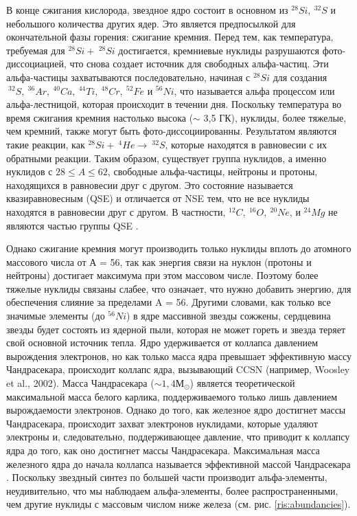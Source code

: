 \documentclass[%
master,    %
natbib,      %
subf,        %
href,        %
colorlinks,  %
]{disser}
\begin{document}
В конце сжигания кислорода, звездное ядро состоит в основном из $^{28}Si, \ ^{32}S$ и небольшого количества других ядер. Это является предпосылкой для окончательной фазы горения: сжигание кремния. Перед тем, как температура, требуемая для $^{28}Si + \ ^{28}Si$ достигается, кремниевые нуклиды разрушаются фото-диссоциацией, что снова создает источник для свободных альфа-частиц. Эти альфа-частицы захватываются последовательно, начиная с $^{28}Si$ для создания $\ ^{32}S, \ ^{36}Ar, \ ^{40}Ca, \ ^{44}Ti, \ ^{48}Cr, \ ^{52}Fe$ и $^{56}Ni$, что называется альфа процессом или альфа-лестницой, которая происходит в течении дня. Поскольку температура во время сжигания кремния настолько высока ($\sim$ 3,5 ГК), нуклиды, более тяжелые, чем кремний, также могут быть фото-диссоциированны. Результатом являются такие реакции, как  $^{28}Si + \ ^4He \rightarrow \ ^{32}S$, которые находятся в равновесии с их обратными реакции. Таким образом, существует группа нуклидов, а именно нуклидов с $28 \le A \le 62$, свободные альфа-частицы, нейтроны и протоны, находящихся в равновесии друг с другом. Это состояние называется квазиравновесным (QSE) и отличается от NSE тем, что не все нуклиды находятся в равновесии друг с другом. В частности, $^{12}C, \ ^{16}O, \ ^{20}Ne$, и $^{24}Mg$ не являются частью группы QSE \cite{qse}.

Однако сжигание кремния могут производить только нуклиды вплоть до атомного массового числа от А = 56, так как энергия связи на нуклон (протоны и нейтроны) достигает максимума при этом массовом числе. Поэтому более тяжелые нуклиды связаны слабее, что означает, что нужно добавить энергию, для обеспечения слияние за пределами A = 56. Другими словами, как только все значимые элементы (до $^{56}Ni$) в ядре массивной звезды сожжены, сердцевина звезды будет состоять из ядерной пыли, которая не может гореть и звезда теряет свой основной источник тепла. Ядро удерживается от коллапса давлением вырождения электронов, но как только масса ядра превышает эффективную массу Чандрасекара, происходит коллапс ядра, вызывающий CCSN (например, Woosley et al., 2002). Масса Чандрасекара ($\sim 1,4 М_\odot$) является теоретической максимальной масса белого карлика, поддерживаемого только лишь давлением вырождаемости электронов. Однако до того, как железное ядро достигнет массы Чандрасекара, происходит захват электронов нуклидами, которые удаляют электроны и, следовательно, поддерживающее давление, что приводит к коллапсу ядра до того, как оно достигнет массы Чандрасекара. Максимальная масса железного ядра до начала коллапса называется эффективной массой Чандрасекара \cite{massive}. Поскольку звездный синтез по большей части производит альфа-элементы, неудивительно, что мы наблюдаем альфа-элементы, более распространенными, чем другие нуклиды с массовым числом ниже железа (см. рис. \ref{ris:abundancies}).
\end{document}
